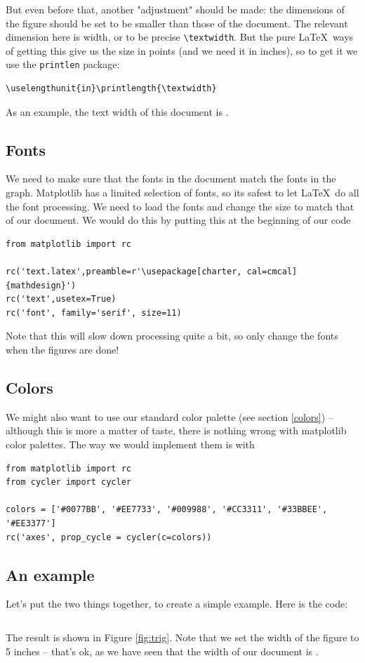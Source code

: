 \documentclass[letterpaper,11pt]{notes}
\theoremstyle{definition}
\theoremstyle{plain}
\theoremstyle{remark}
\begin{document}
But even before that, another "adjustment" should be made: the dimensions of the figure should be set to be smaller than those of the document. The relevant dimension here is width, or to be precise \texttt{\textbackslash{}textwidth}. But the pure \LaTeX\ ways of getting this give us the size in points (and we need it in inches), so to get it we use the \texttt{printlen} package:
\begin{verbatim}
\uselengthunit{in}\printlength{\textwidth}
\end{verbatim}
As an example, the text width of this document is \printlength{\textwidth}.



\subsection{Fonts}

We need to make sure that the fonts in the document match the fonts in the graph. Matplotlib has a limited selection of fonts, so its safest to let \LaTeX\ do all the font processing. We need to load the fonts and change the size to match that of our document. We would do this by putting this at the beginning of our code
\begin{verbatim}
from matplotlib import rc

rc('text.latex',preamble=r'\usepackage[charter, cal=cmcal]{mathdesign}')
rc('text',usetex=True)
rc('font', family='serif', size=11)
\end{verbatim}

Note that this will slow down processing quite a bit, so \alert{only change the fonts when the figures are done!}

\subsection{Colors}

We might also want to use our standard color palette (see section \ref{colors}) -- although this is more a matter of taste, there is nothing wrong with matplotlib color palettes. The way we would implement them is with
\begin{verbatim}
from matplotlib import rc
from cycler import cycler

colors = ['#0077BB', '#EE7733', '#009988', '#CC3311', '#33BBEE', '#EE3377']
rc('axes', prop_cycle = cycler(c=colors))
\end{verbatim}


\subsection{An example}
Let's put the two things together, to create a simple example. Here is the code:
\inputminted[linenos]{python}{fig.py}%
The result is shown in Figure \ref{fig:trig}. Note that we set the width of the figure to 5 inches -- that's ok, as we have seen that the width of our document is \printlength{\textwidth}. 
\end{document}
